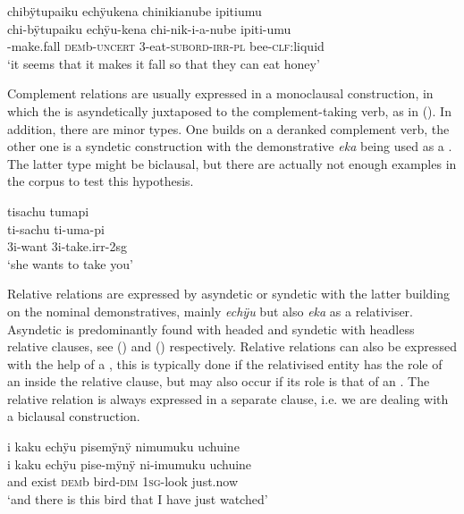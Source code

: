\ea\label{ex:Sketch-ADV-der}
\begingl 
\glpreamble chibÿtupaiku echÿukena chinikianube ipitiumu\\
\gla chi-bÿtupaiku echÿu-kena chi-nik-i-a-nube ipiti-umu\\ 
-make.fall \textsc{dem}b-\textsc{uncert} 3-eat-\textsc{subord}-\textsc{irr}-\textsc{pl} bee-\textsc{clf}:liquid\\ 
\glft ‘it seems that it makes it fall so that they can eat honey’
\endgl
\xe
{}

Complement relations are usually expressed in a monoclausal construction, in which the  is asyndetically juxtaposed to the complement-taking verb, as in (). In addition, there are minor types. One builds on a deranked complement verb, the other one is a syndetic construction with the demonstrative \textit{eka} being used as a . The latter type might be biclausal, but there are actually not enough examples in the corpus to test this hypothesis.

\ea\label{ex:Sketch-COMPL}
\begingl
\glpreamble tisachu tumapi\\
\gla ti-sachu ti-uma-pi\\
\glb 3i-want 3i-take.irr-2sg\\
\glft ‘she wants to take you’\\
\endgl
\xe
{}

Relative relations are expressed by asyndetic or syndetic  with the latter building on the nominal demonstratives, mainly \textit{echÿu} but also \textit{eka} as a relativiser. Asyndetic  is predominantly found with headed and syndetic  with headless relative clauses, see () and () respectively. Relative relations can also be expressed with the help of a , this is typically done if the relativised entity has the role of an  inside the relative clause, but may also occur if its role is that of an . The relative relation is always expressed in a separate clause, i.e. we are dealing with a biclausal construction.

\ea\label{ex:Sketch-headed-RC}
\begingl
\glpreamble i kaku echÿu pisemÿnÿ nimumuku uchuine\\
\gla i kaku echÿu pise-mÿnÿ ni-imumuku uchuine\\
\glb and exist \textsc{dem}b bird-\textsc{dim} 1\textsc{sg}-look just.now\\
\glft ‘and there is this bird that I have just watched’ \\
\endgl
\xe


